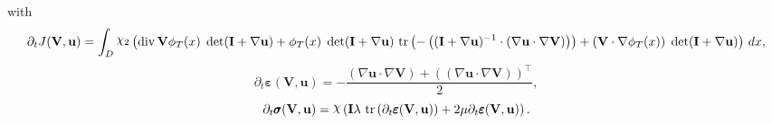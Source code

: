 \documentclass[preview]{standalone}
\let\oldcdot\cdot
\let\cdot\oldcdot
\begin{document}
with
\begin{dmath*}
\partial_{t} J({\mathbf V},{\mathbf{ u }}) =  \int_{D} \raisebox{\depth}{$\chi_2$} \left(\operatorname{div} {\mathbf V} \phi_{T}(x)  \;\operatorname{det}(\mathbf{I} +  \nabla {\mathbf{ u }} )  + \phi_{T}(x)  \;\operatorname{det}(\mathbf{I} +  \nabla {\mathbf{ u }} )   \,\operatorname{tr}\left(- \left(  (\mathbf{I} +  \nabla {\mathbf{ u }} )^{-1}  \cdot \left(  \nabla {\mathbf{ u }}  \cdot  \nabla {\mathbf V}  \right) \right)\right)  + \left( {\mathbf V} \cdot  \nabla \phi_{T}(x)  \right)  \;\operatorname{det}(\mathbf{I} +  \nabla {\mathbf{ u }} ) \right) \,dx,
 \end{dmath*}
\begin{dmath*}
\partial_{t} \pmb \varepsilon({\mathbf V},{\mathbf{ u }}) = - \frac{\left(  \nabla {\mathbf{ u }}  \cdot  \nabla {\mathbf V}  \right) +  \left( \left(  \nabla {\mathbf{ u }}  \cdot  \nabla {\mathbf V}  \right) \right)^\top }{2},
 \end{dmath*}
\begin{dmath*}
\partial_{t} \pmb \sigma({\mathbf V},{\mathbf{ u }}) = \raisebox{\depth}{$\chi$} \left(\mathbf{I} \lambda  \,\operatorname{tr}\left(\partial_{t} \pmb \varepsilon({\mathbf V},{\mathbf{ u }})\right)  + 2 \mu \partial_{t} \pmb \varepsilon({\mathbf V},{\mathbf{ u }})\right).
 \end{dmath*}
\end{document}
